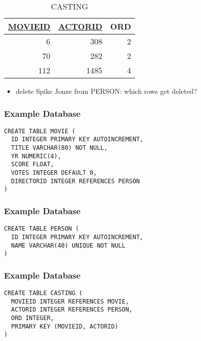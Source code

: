 \documentclass[dvipsnames]{beamer}
\theoremstyle{plain}
\begin{document}
\begin{frame}
  \vspace{-12pt}
  \begin{tiny}
  \begin{table}
    \caption{CASTING}
    \begin{tabular}{|r|r|r|}\hline
\underline{MOVIEID} & \underline{ACTORID} & ORD\\[2pt]\hline\hline
                  6 &                 308 &   2\\\hline
                 70 &                 282 &   2\\\hline
                112 &                1485 &   4\\\hline
    \end{tabular}
  \end{table}
  \end{tiny}

  \begin{itemize}
    \item delete Spike Jonze from PERSON: which rows get deleted?
  \end{itemize}
\end{frame}

\begin{frame}[fragile]
  \frametitle{Example Database}

  \begin{lstlisting}
CREATE TABLE MOVIE (
  ID INTEGER PRIMARY KEY AUTOINCREMENT,
  TITLE VARCHAR(80) NOT NULL,
  YR NUMERIC(4),
  SCORE FLOAT,
  VOTES INTEGER DEFAULT 0,
  DIRECTORID INTEGER REFERENCES PERSON
)
  \end{lstlisting}
\end{frame}

\begin{frame}[fragile]
  \frametitle{Example Database}

  \begin{lstlisting}
CREATE TABLE PERSON (
  ID INTEGER PRIMARY KEY AUTOINCREMENT,
  NAME VARCHAR(40) UNIQUE NOT NULL
)
  \end{lstlisting}
\end{frame}

\begin{frame}[fragile]
  \frametitle{Example Database}

  \begin{lstlisting}
CREATE TABLE CASTING (
  MOVIEID INTEGER REFERENCES MOVIE,
  ACTORID INTEGER REFERENCES PERSON,
  ORD INTEGER,
  PRIMARY KEY (MOVIEID, ACTORID)
)
  \end{lstlisting}
\end{frame}
\end{document}
